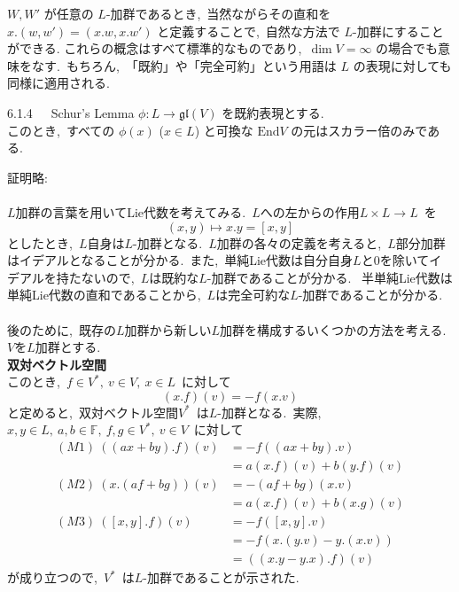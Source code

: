 \documentclass[uplatex,dvipdfmx]{jsarticle}
\begin{document}
$W, W'$ が任意の $L$-加群であるとき,~当然ながらその直和を $x.(w, w') = (x.w, x.w')$ と定義することで,~自然な方法で $L$-加群にすることができる.
これらの概念はすべて標準的なものであり,~$\dim V = \infty$ の場合でも意味をなす.~もちろん,~「既約」や「完全可約」という用語は $L$ の表現に対しても同様に適用される.
\begin{mylemma}{6.1.4~~~Schur's Lemma}
    $\phi: L \to \mathfrak{gl}(V)$ を既約表現とする.\\
    このとき,~すべての $\phi(x)$ ($x \in L$) と可換な $\text{End} V$ の元はスカラー倍のみである.
\end{mylemma}
証明略:\\\\
$L$加群の言葉を用いてLie代数を考えてみる.~$L$への左からの作用$L\times L \to L$~を
\begin{equation*}
    (x,y)\mapsto x.y=[x,y]
\end{equation*}
としたとき,~$L$自身は$L$-加群となる.~$L$加群の各々の定義を考えると,~$L$部分加群はイデアルとなることが分かる.~また,~単純Lie代数は自分自身$L$と$0$を除いてイデアルを持たないので,~$L$は既約な$L$-加群であることが分かる.~
半単純Lie代数は単純Lie代数の直和であることから,~$L$は完全可約な$L$-加群であることが分かる.\\\\
後のために,~既存の$L$加群から新しい$L$加群を構成するいくつかの方法を考える.~$V$を$L$加群とする.\\
\textbf{双対ベクトル空間}\\
このとき,~$f\in V^*,~v\in V ,~x\in L$~に対して
\begin{equation*}
    (x.f)(v)=-f(x.v)
\end{equation*}
と定めると,~双対ベクトル空間$V^*$~は$L$-加群となる.~実際,~$x,y\in L,~a,b\in \mathbb{F},~f,g\in V^*,~v\in V$~に対して
\begin{equation}
    \begin{split}
        (M1)~((ax+by).f)(v) &= -f((ax+by).v)\\
        &= a(x.f)(v) + b(y.f)(v)\\
        (M2)~(x.(af+bg))(v) &= -(af+bg)(x.v)\\
        &= a(x.f)(v) + b(x.g)(v)\\
        (M3)~([x,y].f)(v) &= -f([x,y].v)\\
        &= -f(x.(y.v) - y.(x.v))\\
        &= ((x.y - y.x).f)(v)
    \end{split}
\end{equation}
が成り立つので,~$V^*$~は$L$-加群であることが示された.\\
\end{document}
